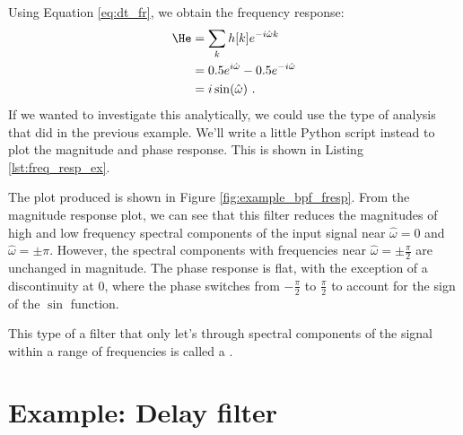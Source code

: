 Using Equation \ref{eq:dt_fr}, we obtain the frequency response:
\begin{align}
\He & = \sum_k h[k] e^{-i\hat{\omega}k}\\
    & = 0.5e^{i\hat{\omega}} -  0.5e^{-i\hat{\omega}} \\
    &= i \sin(\hat{\omega}) \,\,.
\end{align}
If we wanted to investigate this analytically, we could use the type
of analysis that did in the previous example. We'll write a little
Python script instead to plot the magnitude and phase response. This is shown in Listing \ref{lst:freq_resp_ex}.

The plot produced is shown in Figure \ref{fig:example_bpf_fresp}. From
the magnitude response plot, we can see that this filter reduces the
magnitudes of high and low frequency spectral components of the input
signal near $\hat{\omega}=0$ and $\hat{\omega}=\pm \pi$. However, the
spectral components with frequencies near
$\hat{\omega}=\pm \frac{\pi}{2}$ are unchanged in magnitude. The phase
response is flat, with the exception of a discontinuity at 0, where
the phase switches from $-\frac{\pi}{2}$ to $\frac{\pi}{2}$ to account
for the sign of the $\sin$ function.

This type of a filter that only let's through spectral components of
the signal within a range of frequencies is called a \emph{}. 



\section{Example: Delay filter}

